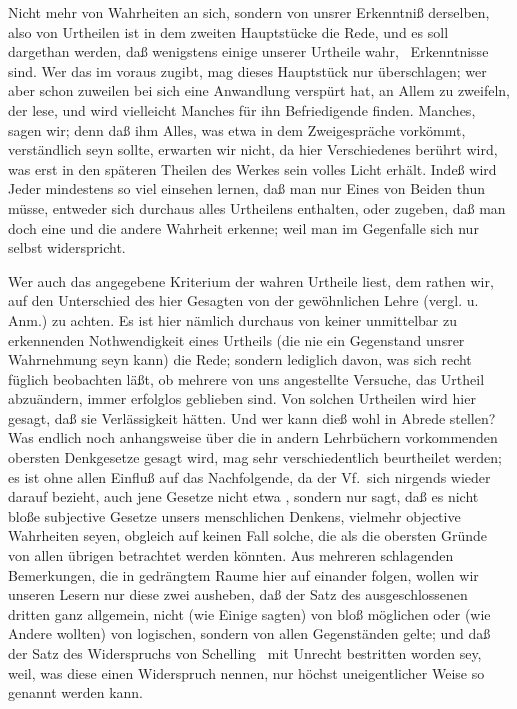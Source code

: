 Nicht mehr von Wahrheiten an sich, sondern von unsrer Erkenntniß derselben, also von Urtheilen ist in dem zweiten Hauptstücke die Rede, und es soll dargethan werden, daß wenigstens einige unserer Urtheile wahr, \dh\  Erkenntnisse sind. Wer das im voraus zugibt, mag dieses Hauptstück nur überschlagen; wer aber  schon zuweilen bei sich eine Anwandlung verspürt hat, an Allem zu zweifeln, der lese, und wird vielleicht Manches für ihn Befriedigende finden. Manches, sagen wir; denn daß ihm Alles, was etwa in dem Zweigespräche  vorkömmt, verständlich seyn sollte, erwarten wir nicht, da hier Verschiedenes berührt wird, was erst in den späteren Theilen des Werkes sein volles Licht erhält. Indeß wird Jeder mindestens so viel einsehen lernen, daß man nur Eines von Beiden thun müsse, entweder sich durchaus alles Urtheilens enthalten, oder zugeben, daß man doch eine und die andere Wahrheit erkenne; weil man im Gegenfalle sich nur selbst widerspricht. \par
Wer auch das  angegebene Kriterium der wahren Urtheile liest, dem rathen wir, auf den Unterschied des hier Gesagten von der gewöhnlichen Lehre (vergl.  u.  Anm.) zu achten. Es ist hier nämlich durchaus von keiner unmittelbar zu erkennenden Nothwendigkeit eines Urtheils (die nie ein Gegenstand unsrer Wahrnehmung seyn kann) die Rede; sondern lediglich davon, was sich recht füglich beobachten läßt, ob mehrere von uns angestellte Versuche, das Urtheil abzuändern, immer erfolglos geblieben sind. Von solchen Urtheilen wird hier gesagt, daß sie Verlässigkeit hätten. Und wer kann dieß wohl in Abrede stellen? Was endlich noch anhangsweise  über die in andern Lehrbüchern vorkommenden obersten Denkgesetze gesagt wird, mag sehr verschiedentlich beurtheilet werden; es ist ohne allen Einfluß auf das Nachfolgende, da der Vf.\ sich nirgends wieder darauf bezieht, auch jene Gesetze nicht etwa , sondern nur sagt, daß es nicht bloße subjective Gesetze unsers menschlichen Denkens, vielmehr objective Wahrheiten seyen, obgleich auf keinen Fall solche, die als die obersten Gründe von allen übrigen betrachtet werden könnten. Aus mehreren schlagenden Bemerkungen, die in gedrängtem Raume hier auf einander folgen, wollen wir unseren Lesern nur diese zwei ausheben, daß der Satz des ausgeschlossenen dritten ganz allgemein, nicht (wie Einige sagten) von bloß möglichen oder (wie Andere wollten) von logischen, sondern von allen Gegenständen gelte; und daß der Satz des Widerspruchs von Schelling \uA\ mit  Unrecht bestritten worden sey, weil, was diese einen Widerspruch nennen, nur höchst uneigentlicher Weise so genannt werden kann. \par
